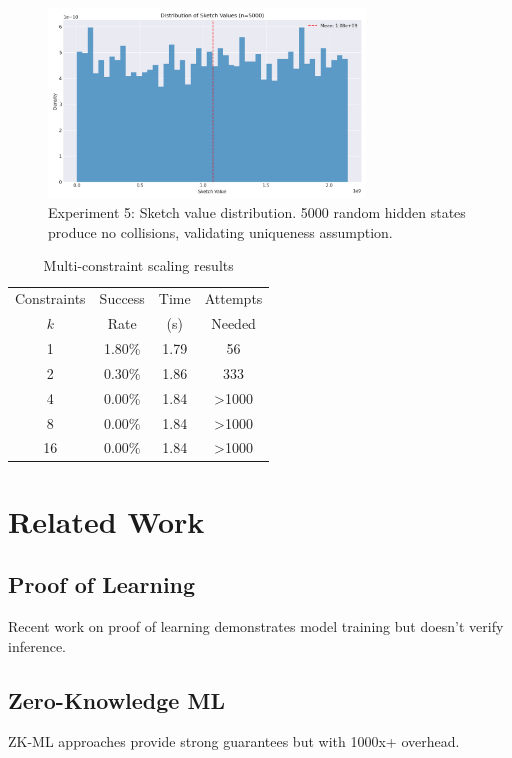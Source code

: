 \documentclass[11pt,a4paper]{article}
\begin{document}
\begin{figure}[ht]
\centering
\includegraphics[width=0.75\textwidth]{experiment_5_sketch_distribution.png}
\caption{Experiment 5: Sketch value distribution. 5000 random hidden states produce no collisions, validating uniqueness assumption.}
\label{fig:exp5b}
\end{figure}

\begin{table}[h]
\centering
\begin{tabular}{|c|c|c|c|}
\hline
Constraints & Success & Time & Attempts \\
$k$ & Rate & (s) & Needed \\
\hline
1 & 1.80\% & 1.79 & 56 \\
2 & 0.30\% & 1.86 & 333 \\
4 & 0.00\% & 1.84 & >1000 \\
8 & 0.00\% & 1.84 & >1000 \\
16 & 0.00\% & 1.84 & >1000 \\
\hline
\end{tabular}
\caption{Multi-constraint scaling results}
\label{tab:scaling}
\end{table}

\section{Related Work}

\subsection{Proof of Learning}
Recent work on proof of learning \cite{jia2021proof} demonstrates model training but doesn't verify inference.

\subsection{Zero-Knowledge ML}
ZK-ML approaches \cite{zkml2023} provide strong guarantees but with 1000x+ overhead.
\end{document}
